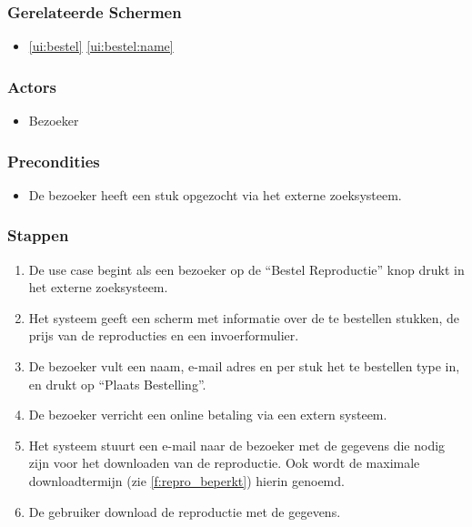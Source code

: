 \documentclass[a4paper,titlepage]{report}
\def\namedref#1{\ref{#1} \ref{#1:name}}
\begin{document}
      \subsubsection{Gerelateerde Schermen}
        \begin{itemize}
          \item \namedref{ui:bestel}
        \end{itemize}
      \subsubsection{Actors}
        \begin{itemize}
          \item Bezoeker
        \end{itemize}
      \subsubsection{Precondities}
        \begin{itemize}
          \item De bezoeker heeft een stuk opgezocht via het externe
            zoeksysteem.
        \end{itemize}
      \subsubsection{Stappen}
        \begin{enumerate}
          \item\label{u:kopen:begin}
            De use case begint als een bezoeker op de ``Bestel Reproductie''
            knop drukt in het externe zoeksysteem.
          \item\label{u:kopen:info}
            Het systeem geeft een scherm met informatie over de te bestellen
            stukken, de prijs van de reproducties en een invoerformulier.
          \item\label{u:kopen:submit}
            De bezoeker vult een naam, e-mail adres en per stuk het te
            bestellen type in, en drukt op ``Plaats Bestelling''.
          \item\label{u:kopen:betaling}
            De bezoeker verricht een online betaling via een extern systeem.
          \item\label{u:kopen:access}
            Het systeem stuurt een e-mail naar de bezoeker met de gegevens die
            nodig zijn voor het downloaden van de reproductie. Ook wordt de
            maximale downloadtermijn (zie \ref{f:repro_beperkt}) hierin
            genoemd.
          \item De gebruiker download de reproductie met de gegevens.
        \end{enumerate}
\end{document}
